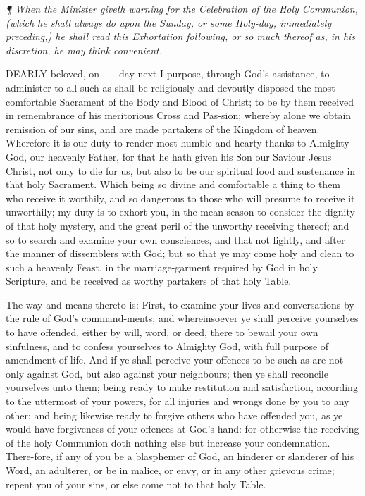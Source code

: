\emph{¶
When the Minister giveth warning for the Celebration of the Holy Communion,
(which he shall always do upon the Sunday, or some Holy-day, immediately
preceding,) he shall read this Exhortation following, or so much thereof
as, in his discretion, he may think convenient.}

DEARLY
beloved, on——day next I purpose, through God's assistance,
to administer to all such as shall be religiously and devoutly disposed
the most comfortable Sacrament of the Body and Blood of Christ; to be
by them received in remembrance of his meritorious Cross and Pas-sion;
whereby alone we obtain remission of our sins, and are made partakers
of the Kingdom of heaven. Wherefore it is our duty to render most humble
and hearty thanks to Almighty God, our heavenly Father, for that he hath
given his Son our Saviour Jesus Christ, not only to die for us, but also
to be our spiritual food and sustenance in that holy Sacrament. Which
being so divine and comfortable a thing to them who receive it worthily,
and so dangerous to those who will presume to receive it unworthily; my
duty is to exhort you, in the mean season to consider the dignity of that
holy mystery, and the great peril of the unworthy receiving thereof; and
so to search and examine your own consciences, and that not lightly, and
after the manner of dissemblers with God; but so that ye may come holy
and clean to such a heavenly Feast, in the marriage-garment required by
God in holy Scripture, and be received as worthy partakers of that holy
Table.

The way and means thereto is: First, to examine your
lives and conversations by the rule of God’s command-ments; and
whereinsoever ye shall perceive yourselves to have offended, either by
will, word, or deed, there to bewail your own sinfulness, and to confess
yourselves to Almighty God, with full purpose of amendment of life. And
if ye shall perceive your offences to be such as are not only against
God, but also against your neighbours; then ye shall reconcile yourselves
unto them; being ready to make restitution and satisfaction, according
to the uttermost of your powers, for all injuries and wrongs done by you
to any other; and being likewise ready to forgive others who have offended
you, as ye would have forgiveness of your offences at God's hand: for
otherwise the receiving of the holy Communion doth nothing else but increase
your condemnation. There-fore, if any of you be a blasphemer of God, an
hinderer or slanderer of his Word, an adulterer, or be in malice, or envy,
or in any other grievous crime; repent you of your sins, or else come
not to that holy Table.

